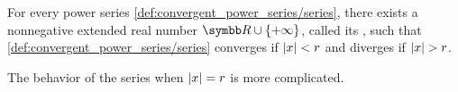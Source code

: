 \begin{theorem}\label{thm:power_series_radius_of_convergence}
  For every power series \cref{def:convergent_power_series/series}, there exists a nonnegative extended real number \( \R \cup \{ +\infty \} \), called its , such that \cref{def:convergent_power_series/series} converges if \( \left\vert x \right\vert < r \) and diverges if \( \left\vert x \right\vert > r \).

  The behavior of the series when \( \left\vert x \right\vert = r \) is more complicated.
\end{theorem}
